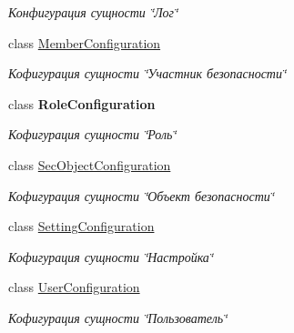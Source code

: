 \begin{DoxyCompactItemize}
\begin{DoxyCompactList}\small\item\em Конфигурация сущности \char`\"{}Лог\char`\"{} \end{DoxyCompactList}\item 
class \hyperlink{class_security_1_1_entity_dal_1_1_entity_configurations_1_1_member_configuration}{Member\+Configuration}
\begin{DoxyCompactList}\small\item\em Кофигурация сущности \char`\"{}Участник безопасности\char`\"{} \end{DoxyCompactList}\item 
class {\bfseries Role\+Configuration}
\begin{DoxyCompactList}\small\item\em Кофигурация сущности \char`\"{}Роль\char`\"{} \end{DoxyCompactList}\item 
class \hyperlink{class_security_1_1_entity_dal_1_1_entity_configurations_1_1_sec_object_configuration}{Sec\+Object\+Configuration}
\begin{DoxyCompactList}\small\item\em Кофигурация сущности \char`\"{}Объект безопасности\char`\"{} \end{DoxyCompactList}\item 
class \hyperlink{class_security_1_1_entity_dal_1_1_entity_configurations_1_1_setting_configuration}{Setting\+Configuration}
\begin{DoxyCompactList}\small\item\em Кофигурация сущности \char`\"{}Настройка\char`\"{} \end{DoxyCompactList}\item 
class \hyperlink{class_security_1_1_entity_dal_1_1_entity_configurations_1_1_user_configuration}{User\+Configuration}
\begin{DoxyCompactList}\small\item\em Кофигурация сущности \char`\"{}Пользователь\char`\"{} \end{DoxyCompactList}\end{DoxyCompactItemize}
